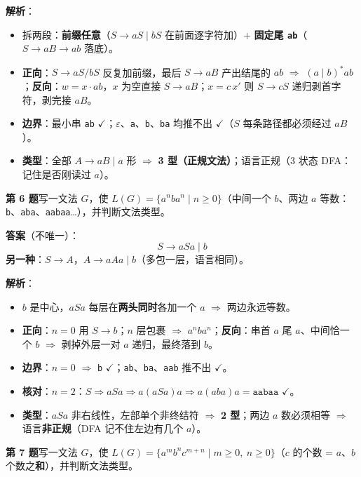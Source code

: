 \documentclass[12pt,a4paper,fontset=windows]{ctexart}
\newcommand{\ok}{\ensuremath{\checkmark}}
\newcommand{\imp}{\ensuremath{\Rightarrow}}
\begin{document}
\textbf{解析}：
\begin{itemize}
\item 拆两段：\textbf{前缀任意}（$S \to aS \mid bS$ 在前面逐字符加）+ \textbf{固定尾 \texttt{ab}}（$S \to aB \to ab$ 落底）。
\item \textbf{正向}：$S \to aS/bS$ 反复加前缀，最后 $S \to aB$ 产出结尾的 $ab$ \imp{} $(a \mid b)^* ab$；\textbf{反向}：$w = x \cdot ab$，$x$ 为空直接 $S \to aB$；$x = c\, x'$ 则 $S \to cS$ 递归剥首字符，剥完接 $aB$。
\item \textbf{边界}：最小串 \texttt{ab} \ok；$\varepsilon$、\texttt{a}、\texttt{b}、\texttt{ba} 均推不出 \ok（$S$ 每条路径都必须经过 $aB$）。
\item \textbf{类型}：全部 $A \to aB \mid a$ 形 \imp{} \textbf{3 型（正规文法）}；语言正规（3 状态 DFA：记住是否刚读过 $a$）。
\end{itemize}

\begin{qbox}
{\large\bfseries 第 6 题}\quad 写一文法 $G$，使 $L(G)=\{a^n b a^n \mid n \ge 0\}$（中间一个 $b$、两边 $a$ 等数：\texttt{b}、\texttt{aba}、\texttt{aabaa}…），并判断文法类型。
\end{qbox}

\textbf{答案}（不唯一）：
\[ S \to aSa \mid b \]
\textbf{另一种}：$S \to A$，$A \to aAa \mid b$（多包一层，语言相同）。

\textbf{解析}：
\begin{itemize}
\item $b$ 是中心，$aSa$ 每层在\textbf{两头同时}各加一个 $a$ \imp{} 两边永远等数。
\item \textbf{正向}：$n=0$ 用 $S \to b$；$n$ 层包裹 \imp{} $a^n b a^n$；\textbf{反向}：串首 $a$ 尾 $a$、中间恰一个 $b$ \imp{} 剥掉外层一对 $a$ 递归，最终落到 $b$。
\item \textbf{边界}：$n=0$ \imp{} \texttt{b} \ok；\texttt{ab}、\texttt{ba}、\texttt{aab} 推不出 \ok。
\item \textbf{核对}：$n=2$：$S \Rightarrow aSa \Rightarrow a(aSa)a \Rightarrow a(aba)a = \texttt{aabaa}$ \ok。
\item \textbf{类型}：$aSa$ 非右线性，左部单个非终结符 \imp{} \textbf{2 型}；两边 $a$ 数必须相等 \imp{} 语言\textbf{非正规}（DFA 记不住左边有几个 $a$）。
\end{itemize}

\begin{qbox}
{\large\bfseries 第 7 题}\quad 写一文法 $G$，使 $L(G)=\{a^m b^n c^{m+n} \mid m \ge 0,\ n \ge 0\}$（$c$ 的个数 = $a$、$b$ 个数之\textbf{和}），并判断文法类型。
\end{qbox}
\end{document}
